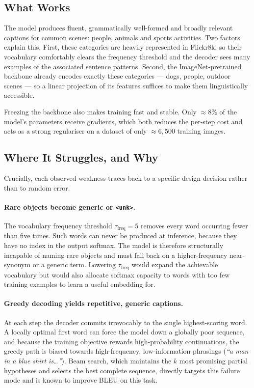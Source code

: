 \documentclass{article}
\begin{document}
\subsection{What Works}

The model produces fluent, grammatically well-formed and broadly relevant
captions for common scenes: people, animals and sports activities. Two factors
explain this. First, these categories are heavily represented in Flickr8k, so
their vocabulary comfortably clears the frequency threshold and the decoder sees
many examples of the associated sentence patterns. Second, the ImageNet-pretrained
backbone already encodes exactly these categories --- dogs, people, outdoor
scenes --- so a linear projection of its features suffices to make them
linguistically accessible.

Freezing the backbone also makes training fast and stable. Only $\approx 8\%$ of
the model's parameters receive gradients, which both reduces the per-step cost
and acts as a strong regulariser on a dataset of only $\approx 6{,}500$ training
images.

\subsection{Where It Struggles, and Why}

Crucially, each observed weakness traces back to a specific design decision
rather than to random error.

\paragraph{Rare objects become generic or \texttt{<unk>}.}
The vocabulary frequency threshold $\tau_{\text{freq}} = 5$ removes every word
occurring fewer than five times. Such words can never be produced at inference,
because they have no index in the output softmax. The model is therefore
structurally incapable of naming rare objects and must fall back on a
higher-frequency near-synonym or a generic term. Lowering $\tau_{\text{freq}}$
would expand the achievable vocabulary but would also allocate softmax capacity
to words with too few training examples to learn a useful embedding for.

\paragraph{Greedy decoding yields repetitive, generic captions.}
At each step the decoder commits irrevocably to the single highest-scoring word.
A locally optimal first word can force the model down a globally poor sequence,
and because the training objective rewards high-probability continuations, the
greedy path is biased towards high-frequency, low-information phrasings
(\emph{``a man in a blue shirt is\dots''}). Beam search, which maintains the $k$
most promising partial hypotheses and selects the best complete sequence, directly
targets this failure mode and is known to improve BLEU on this task.
\end{document}
